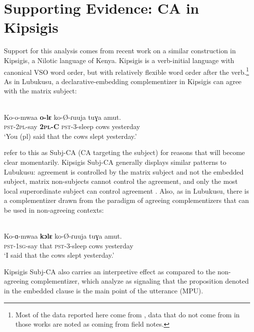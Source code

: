 \section{Supporting Evidence: CA in Kipsigis}\label{CA in Kipsigis}

Support for this analysis comes from recent work on a similar construction in Kipsigis, a Nilotic language of Kenya. Kipsigis is a verb-initial language with canonical VSO word order, but with relatively flexible word order after the verb.\footnote{Most of the data reported here come from \citet{Rao:2016} \citet{DiercksRao:2017}, data that do not come from in those works are noted as coming from field notes.} As in Lubukusu, a declarative-embedding complementizer in Kipsigis can agree with the matrix subject: 

\ea \label{BasicKipsigisSubj-CA}
 \\
\gll Ko-o-mwaa \textbf{o-lɛ} ko-\O-ɾuuja tuɣa amut. \\
\textsc{pst}-2\textsc{pl}-say \textbf{2\textsc{pl}-C} \textsc{pst}-3-sleep cows yesterday \\
\glt `You (pl) said that the cows slept yesterday.'

\z

\citeauthor{DiercksRao:2017} refer to this as Subj-CA (CA targeting the subject) for reasons that will become clear momentarily. Kipsigis Subj-CA generally displays similar patterns to Lubukusu: agreement is controlled by the matrix subject and not the embedded subject, matrix non-subjects cannot control the agreement, and only the most local superordinate subject can control agreement \citep{Rao:2016,DiercksRao:2017}. Also, as in Lubukusu, there is a complementizer drawn from the paradigm of agreeing complementizers that can be used in non-agreeing contexts:   

\ea \label{KipsigisNon-AgreeingCA}
 \\
\gll	Ko-ɑ-mwaa \textbf{kɔlɛ} ko-\O-ɾuuja tuɣa amut. \\
\textsc{pst}-1\textsc{sg}-say that \textsc{pst}-3-sleep cows yesterday \\
\glt `I said that the cows slept yesterday.'
\z

\noindent Kipsigis Subj-CA also carries an interpretive effect as compared to the non-agreeing complementizer, which \citet{DiercksRao:2017} analyze as signaling that the proposition denoted in the embedded clause is the main point of the utterance (MPU). 

